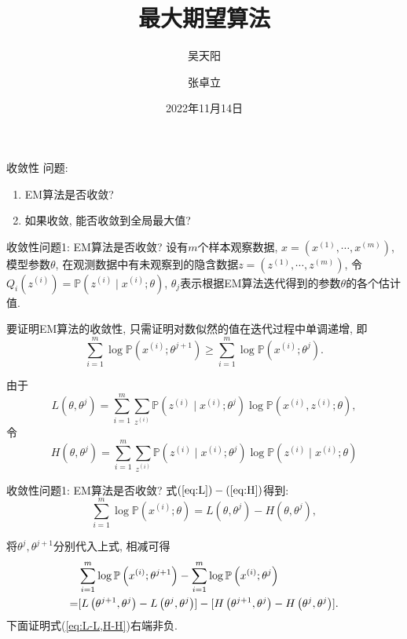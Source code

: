 \documentclass[UTF8]{ctexbeamer}
\title{最大期望算法}
\author{吴天阳\and 张卓立}
\institute{XJTU\and 强基数学}
\date{2022年11月14日}
\renewcommand{\P}{\mathbb{P}}
\begin{document}
        \maketitle
    
    \begin{frame}{收敛性}
        问题: 
        \begin{enumerate}
            \item EM算法是否收敛?
            \item 如果收敛, 能否收敛到全局最大值?
        \end{enumerate}
    \end{frame}

    \begin{frame}{收敛性}{问题1: EM算法是否收敛?}
        设有$m$个样本观察数据, $x=(x^{(1)},\cdots,x^{(m)})$, 
        模型参数$\theta$, 在观测数据中有未观察到的隐含数据$z=(z^{(1)},\cdots,z^{(m)})$, 
        令$Q_i\left(z^{(i)}\right)=\P\left(z^{(i)}\mid x^{(i)};\theta\right)$, 
        $\theta_j$表示根据EM算法迭代得到的参数$\theta$的各个估计值.

        要证明EM算法的收敛性, 只需证明对数似然的值在迭代过程中单调递增, 即 
        \begin{equation*}
            \sum_{i=1}^m\log \P\left(x^{(i)};\theta^{j+1}\right)\geqslant \sum_{i=1}^m\log\P\left(x^{(i)};\theta^j\right).
        \end{equation*}

        由于
        \begin{equation}
            \label{eq:L}
            L\left(\theta,\theta^j\right)=\sum_{i=1}^m\sum_{z^{(i)}}\P\left(z^{(i)}\mid x^{(i)};\theta^j\right)\log\P\left(x^{(i)},z^{(i)};\theta\right), 
        \end{equation}
        令
        \begin{equation}
            \label{eq:H}
            H(\theta,\theta^j)=\sum_{i=1}^m\sum_{z^{(i)}}\P\left(z^{(i)}\mid x^{(i)};\theta^j\right)\log\P\left(z^{(i)}\mid x^{(i)};\theta\right)
        \end{equation}
    \end{frame}

    \begin{frame}{收敛性}{问题1: EM算法是否收敛?}
        式$(\ref{eq:L})-(\ref{eq:H})$得到: 
        \begin{equation*}
            \sum_{i=1}^m\log\P\left(x^{(i)};\theta\right)=L(\theta,\theta^j)-H(\theta,\theta^j),
        \end{equation*}

        将$\theta^j,\theta^{j+1}$分别代入上式, 相减可得 
        \begin{align}
            &\sum_{i=1}^m\log\P\left(x^{(i)};\theta^{j+1}\right)-\sum_{i=1}^m\log\P\left(x^{(i)};\theta^j\right)\notag\\
            =&[L\left(\theta^{j+1},\theta^j\right)-L\left(\theta^j,\theta^j\right)]-[H\left(\theta^{j+1},\theta^j\right)-H\left(\theta^{j},\theta^j\right)].\label{eq:L-L,H-H}
        \end{align}
        下面证明式(\ref{eq:L-L,H-H})右端非负.
    \end{frame}
\end{document}
